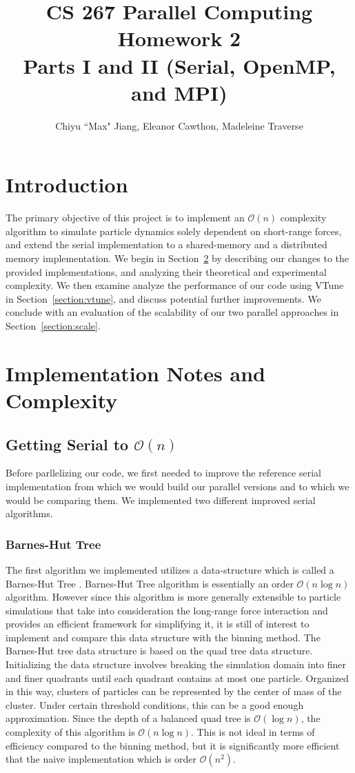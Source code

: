 \documentclass{article}
\title{CS 267 Parallel Computing Homework 2\\
\large{Parts I and II (Serial, OpenMP, and MPI)}}
\author{Chiyu ``Max" Jiang, Eleanor Cawthon, Madeleine Traverse}
\begin{document}
\maketitle
\section{Introduction}
The primary objective of this project is to implement an $\mathcal{O}(n)$
complexity algorithm to simulate particle dynamics solely dependent on
short-range forces, and extend the serial implementation to a shared-memory
and a distributed memory implementation. We begin in
Section~\ref{section:impl} by describing our changes to the provided
implementations, and analyzing their theoretical and experimental complexity. We
then examine analyze the performance of our code using VTune in
Section~\ref{section:vtune}, and discuss potential further improvements.  We
conclude with an evaluation of the scalability of our two parallel approaches in
Section~\ref{section:scale}.
\section{Implementation Notes and Complexity}\label{section:impl}
\subsection{Getting Serial to $\mathcal{O}(n)$}\label{subection:serial}
Before parllelizing our code, we first needed to improve the reference serial
implementation from which we would build our parallel versions and to which we
would be comparing them. We implemented two different improved serial
algorithms.
\subsubsection{Barnes-Hut Tree}
The first algorithm we implemented utilizes a data-structure which is
called a Barnes-Hut Tree \cite{barnes1986hierarchical}.
Barnes-Hut Tree algorithm is essentially an order $\mathcal{O}(n\log n)$
algorithm. However since this algorithm is more generally extensible to particle
simulations that take into consideration the long-range force interaction and
provides an efficient framework for simplifying it, it is still of interest to
implement and compare this data structure with the binning method. The
Barnes-Hut tree data structure is based on the quad tree data structure.
Initializing the data structure involves breaking the simulation domain
into finer and finer quadrants until each quadrant contains at most one
particle. Organized in this way, clusters of particles can be represented by the
center of mass of the cluster. Under certain threshold conditions, this can
be a good enough approximation.  Since the depth of a balanced quad tree is
$\mathcal{O}(\log n)$, the complexity of this algorithm is $\mathcal{O}(n\log
n)$. This is not ideal in terms of efficiency compared to the binning method,
but it is significantly more efficient that the naive implementation which is
order $\mathcal{O}(n^2)$.
\end{document}
